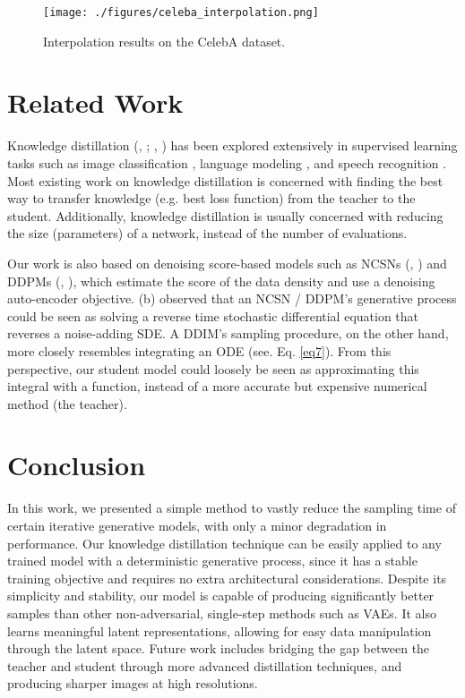 \documentclass[12pt,a4paper]{article}
\newcommand{\citep}[1]{\citeauthor{#1}, \citeyear{#1}}
\newcommand{\citebracket}[1]{\cite{#1}}
\begin{document}
\begin{figure}[H] 
\centering
\texttt{[image: ./figures/celeba\_interpolation.png]}
\caption{Interpolation results on the CelebA dataset.}
\label{fig5celeba_interpolation}
\end{figure}


\section{Related Work}
Knowledge distillation (\citep{bucilua2006model}; \citep{hinton2015distilling}) has been explored extensively in supervised learning tasks such as image classification \citebracket{romero2015fitnets, zagoruyko2016paying, yim2017gift, furlanello2018born, tian2019contrastive, xu2020knowledge}, language modeling \citebracket{sun2019patient, turc2019wellread, sanh2020distilbert, jiao2019tinybert, sun2020contrastive}, and speech recognition \citebracket{chebotar2016distilling, Fukuda2017EfficientKD, watanabe2017student, kim2019knowledge, gao2020distilling}. Most existing work on knowledge distillation is concerned with finding the best way to transfer knowledge (e.g. best loss function) from the teacher to the student. Additionally, knowledge distillation is usually concerned with reducing the size (parameters) of a network, instead of the number of evaluations.

Our work is also based on denoising score-based models such as NCSNs (\citep{song2019generative}) and DDPMs (\citep{ddpm}), which estimate the score of the data density and use a denoising auto-encoder objective. \citeauthor{sde} (\citeyear{sde}b) observed that an NCSN / DDPM's generative process could be seen as solving a reverse time stochastic differential equation that reverses a noise-adding SDE. A DDIM's sampling procedure, on the other hand, more closely resembles integrating an ODE (see. Eq. \ref{eq7}). From this perspective, our student model could loosely be seen as approximating this integral with a function, instead of a more accurate but expensive numerical method (the teacher).

\section{Conclusion}
In this work, we presented a simple method to vastly reduce the sampling time of certain iterative generative models, with only a minor degradation in performance. Our knowledge distillation technique can be easily applied to any trained model with a deterministic generative process, since it has a stable training objective and requires no extra architectural considerations. Despite its simplicity and stability, our model is capable of producing significantly better samples than other non-adversarial, single-step methods such as VAEs. It also learns meaningful latent representations, allowing for easy data manipulation through the latent space. Future work includes bridging the gap between the teacher and student through more advanced distillation techniques, and producing sharper images at high resolutions.
\end{document}
